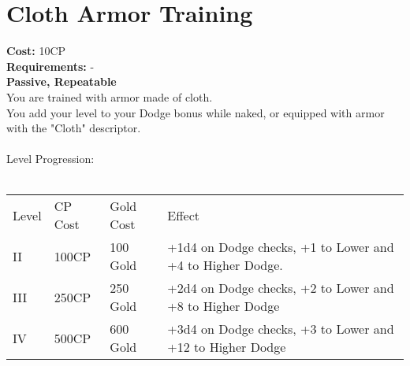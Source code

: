 \section{Cloth Armor Training}\label{perk:clothArmorTraining}
\textbf{Cost:} 10CP\\
\textbf{Requirements:} -\\
\textbf{Passive, Repeatable}\\
You are trained with armor made of cloth.\\
You add your level to your Dodge bonus while naked, or equipped with armor with the "Cloth" descriptor.\\
\\

Level Progression:\\
\\
\begin{tabular}{l | l | l | l}
	Level & CP Cost & Gold Cost & Effect\\
	II & 100CP & 100 Gold & +1d4 on Dodge checks, +1 to Lower and +4 to Higher Dodge.\\
	III & 250CP & 250 Gold & +2d4 on Dodge checks, +2 to Lower and +8 to Higher Dodge\\
	IV & 500CP & 600 Gold & +3d4 on Dodge checks, +3 to Lower and +12 to Higher Dodge\\
\end{tabular}